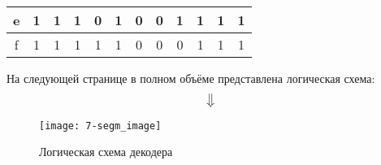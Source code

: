 \begin{table}[!h]
\begin{tabular}{|c|cccc|ccccccc|}
		e                      & \multicolumn{1}{c|}{1}  & \multicolumn{1}{c|}{1}  & \multicolumn{1}{c|}{1}  & 0  & \multicolumn{1}{c|}{1} & \multicolumn{1}{c|}{0} & \multicolumn{1}{c|}{0} & \multicolumn{1}{c|}{1} & \multicolumn{1}{c|}{1} & \multicolumn{1}{c|}{1} & 1 \\ \hline
		f                      & \multicolumn{1}{c|}{1}  & \multicolumn{1}{c|}{1}  & \multicolumn{1}{c|}{1}  & 1  & \multicolumn{1}{c|}{1} & \multicolumn{1}{c|}{0} & \multicolumn{1}{c|}{0} & \multicolumn{1}{c|}{0} & \multicolumn{1}{c|}{1} & \multicolumn{1}{c|}{1} & 1 \\ \hline
	\end{tabular}
	\centering
\end{table}

\large{На следующей странице в полном объёме представлена логическая схема:}
\[
	\big\Downarrow
\]

\begin{figure}[H]
	\centering
	\texttt{[image: 7-segm\_image]}
	\caption{Логическая схема декодера}
\end{figure}

